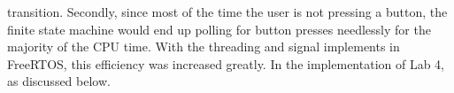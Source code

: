 \documentclass[12pt]{report}
\begin{document}
transition. Secondly, since most of the time the user is not pressing a button, the finite state
machine would end up polling for button presses needlessly for the majority of the CPU time. With
the threading and signal implements in FreeRTOS, this efficiency was increased greatly. In the
implementation of Lab 4, as discussed below.
\end{document}
